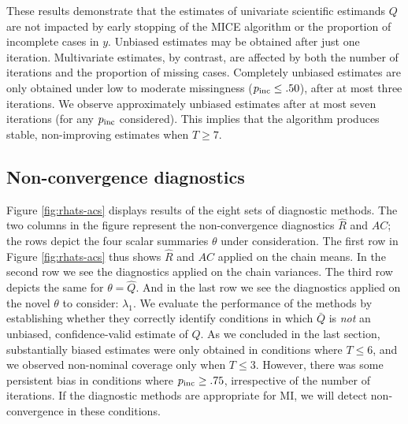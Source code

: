 \documentclass[Royal,times,sageh]{sagej}
\begin{document}
\noindent These results demonstrate that the estimates of univariate scientific estimands \(Q\) are not impacted by early stopping of the MICE algorithm or the proportion of incomplete cases in \(y\). Unbiased estimates may be obtained after just one iteration. Multivariate estimates, by contrast, are affected by both the number of iterations and the proportion of missing cases. Completely unbiased estimates are only obtained under low to moderate missingness (\(p_{\rm inc}\leq.50\)), after at most three iterations. We observe approximately unbiased estimates after at most seven iterations (for any \(p_{\rm inc}\) considered). This implies that the algorithm produces stable, non-improving estimates when \(T\geq7\).

\hypertarget{non-convergence-diagnostics-1}{%
\subsection{Non-convergence diagnostics}\label{non-convergence-diagnostics-1}}

Figure \ref{fig:rhats-acs} displays results of the eight sets of diagnostic methods. The two columns in the figure represent the non-convergence diagnostics \(\widehat{R}\) and \(AC\); the rows depict the four scalar summaries \(\theta\) under consideration. The first row in Figure \ref{fig:rhats-acs} thus shows \(\widehat{R}\) and \(AC\) applied on the chain means. In the second row we see the diagnostics applied on the chain variances. The third row depicts the same for \(\theta=\hat{Q}\). And in the last row we see the diagnostics applied on the novel \(\theta\) to consider: \(\lambda_1\). We evaluate the performance of the methods by establishing whether they correctly identify conditions in which \(\bar{Q}\) is \emph{not} an unbiased, confidence-valid estimate of \(Q\). As we concluded in the last section, substantially biased estimates were only obtained in conditions where \(T\leq6\), and we observed non-nominal coverage only when \(T\leq3\). However, there was some persistent bias in conditions where \(p_{\rm inc}\geq.75\), irrespective of the number of iterations. If the diagnostic methods are appropriate for MI, we will detect non-convergence in these conditions.
\end{document}

